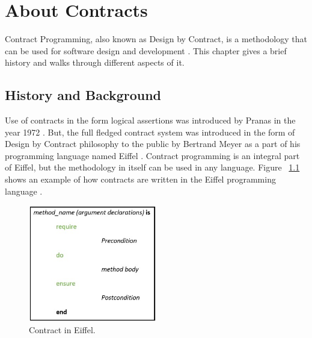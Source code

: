 \chapter{About Contracts}

Contract Programming, also known as Design by Contract, is a methodology that can be used for software design and development \cite{DesignByContractByExample}. This chapter gives a brief history and walks through different aspects of it.

\section{History and Background}

Use of contracts in the form logical assertions was introduced by Pranas in the year 1972 \cite{findler2014behavioral}. But, the full fledged contract system was introduced in the form of Design by Contract philosophy to the public by Bertrand Meyer as a part of his programming language named Eiffel \cite{findler2014behavioral}. Contract programming is an integral part of Eiffel, but the methodology in itself can be used in any language. Figure ~\ref{fig:EiffelContract} shows an example of how contracts are written in the Eiffel programming language \cite{DesignByContractByExample}.

\begin{figure}[htb]
\centering
\includegraphics[width=0.5\textwidth]{images/EiffelContract.jpg}
\caption{Contract in Eiffel.} 
\label{fig:EiffelContract}
\end{figure}

